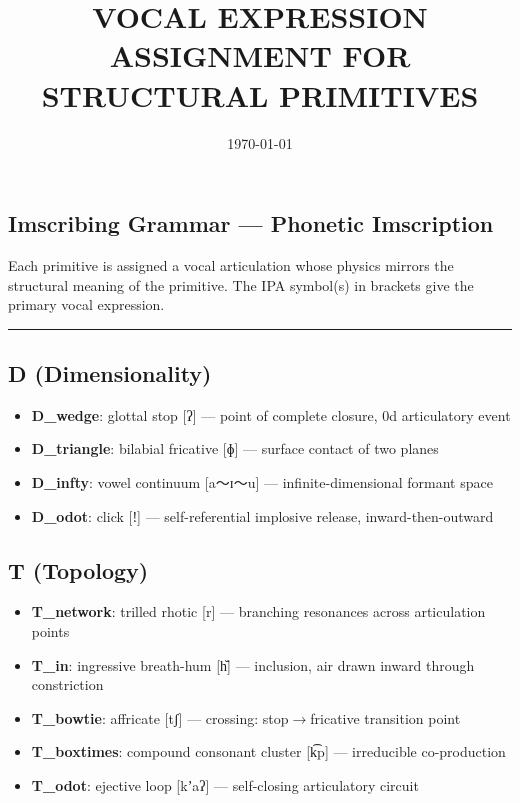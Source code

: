 \documentclass[12pt,a4paper]{article}
\begin{document}
\title{VOCAL EXPRESSION ASSIGNMENT FOR STRUCTURAL PRIMITIVES}
\date{\today}

\maketitle

\subsection{Imscribing Grammar --- Phonetic Imscription}

Each primitive is assigned a vocal articulation whose physics mirrors the structural meaning of the primitive. The IPA symbol(s) in brackets give the primary vocal expression.

\begin{center}
\rule{0.5\textwidth}{0.4pt}
\end{center}

\subsection{D (Dimensionality)}

\begin{itemize}
    \item \textbf{D\_wedge}: glottal stop {[}ʔ{]} --- point of complete closure, 0d articulatory event
    \item \textbf{D\_triangle}: bilabial fricative {[}ɸ{]} --- surface contact of two planes
    \item \textbf{D\_infty}: vowel continuum {[}a～ɪ～u{]} --- infinite-dimensional formant space
    \item \textbf{D\_odot}: click {[}ǃ{]} --- self-referential implosive release, inward-then-outward
\end{itemize}

\subsection{T (Topology)}

\begin{itemize}
    \item \textbf{T\_network}: trilled rhotic {[}r{]} --- branching resonances across articulation points
    \item \textbf{T\_in}: ingressive breath-hum {[}h᷅{]} --- inclusion, air drawn inward through constriction
    \item \textbf{T\_bowtie}: affricate {[}tʃ{]} --- crossing: stop$\rightarrow$fricative transition point
    \item \textbf{T\_boxtimes}: compound consonant cluster {[}k͡p{]} --- irreducible co-production
    \item \textbf{T\_odot}: ejective loop {[}kʼaʔ{]} --- self-closing articulatory circuit
\end{itemize}
\end{document}

